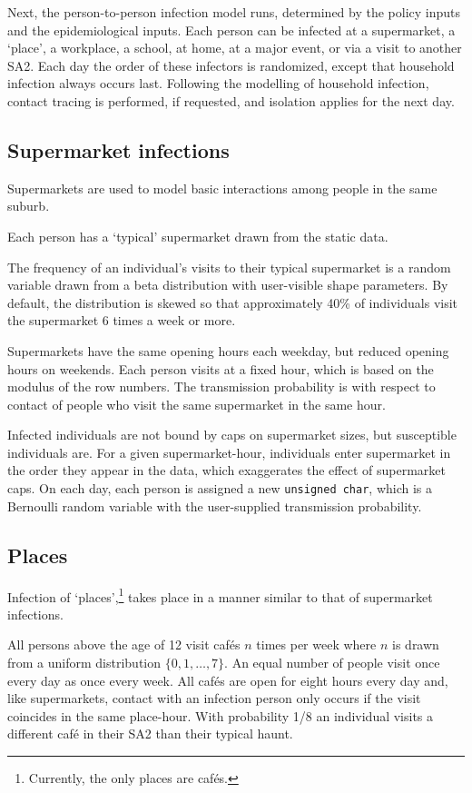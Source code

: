 \documentclass[a4paper,11pt]{scrreprt}
\newcommand*{\code}[1]{\texttt{#1}}
\begin{document}
Next, the person-to-person infection model runs, determined by the policy inputs and
the epidemiological inputs. Each person can be infected at a supermarket, a `place', 
a workplace, a school, at home, at a major event, or via a visit to another SA2. Each day
the order of these infectors is randomized, except that household infection always
occurs last. Following the modelling of household infection, contact tracing is performed,
if requested, and isolation applies for the next day.

\subsection{Supermarket infections}

Supermarkets are used to model basic interactions among people in the same suburb. 

Each person has a `typical' supermarket drawn from the static data.

The frequency of an individual's visits to their typical supermarket is a random variable
drawn from a beta distribution with user-visible shape parameters. By default, the distribution
is skewed so that approximately 40\% of individuals visit the supermarket 6 times a week or
more.

Supermarkets have the same opening hours each weekday, but reduced opening hours on weekends.
Each person visits at a fixed hour, which is based on the modulus of the row numbers. The transmission
probability is with respect to contact of people who visit the same supermarket in the same hour. 

Infected individuals are not bound by caps on supermarket sizes, but susceptible individuals are.
For a given supermarket-hour, individuals enter supermarket in the order they appear in the data,
which exaggerates the effect of supermarket caps. On each day, each person is assigned a
new \code{unsigned char}, which is a Bernoulli random variable with the user-supplied 
transmission probability. 

\subsection{Places}

Infection of `places',\footnote{Currently, the only places are caf\'{e}s.}
takes place in a manner similar to that of supermarket infections.

All persons above the age of 12 visit caf\'es \(n\)
times per week where \(n\) is drawn from a 
uniform distribution \(\{0, 1, \dots, 7\}\). An equal number of people
visit once every day as once every week. All caf\'es are open for eight
hours every day and, like supermarkets, contact with an infection person 
only occurs if the visit coincides in the same place-hour. With probability
1/8 an individual visits a different caf\'e in their SA2 than their typical
haunt.
\end{document}
